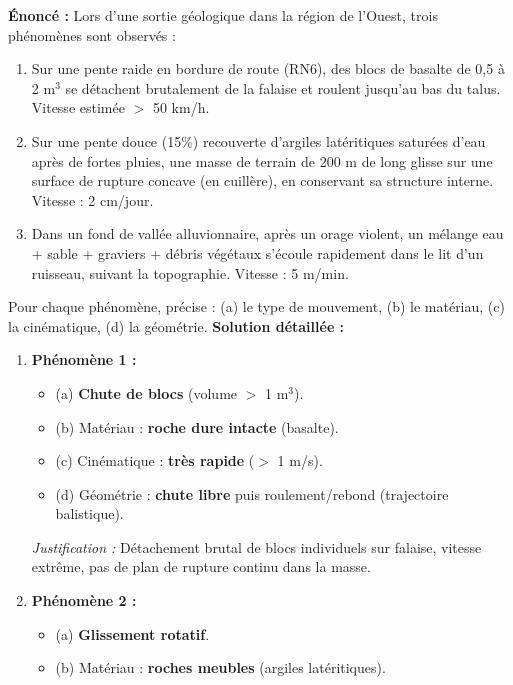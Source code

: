 \documentclass[11pt]{article}
\begin{document}
\begin{exoresolu}
    \textbf{Énoncé :} Lors d'une sortie géologique dans la région de l'Ouest, trois phénomènes sont observés :
    \begin{enumerate}
        \item Sur une pente raide en bordure de route (RN6), des blocs de basalte de 0,5 à 2 m$^3$ se détachent brutalement de la falaise et roulent jusqu'au bas du talus. Vitesse estimée $>$ 50 km/h.
        \item Sur une pente douce (15\%) recouverte d'argiles latéritiques saturées d'eau après de fortes pluies, une masse de terrain de 200 m de long glisse sur une surface de rupture concave (en cuillère), en conservant sa structure interne. Vitesse : 2 cm/jour.
        \item Dans un fond de vallée alluvionnaire, après un orage violent, un mélange eau + sable + graviers + débris végétaux s'écoule rapidement dans le lit d'un ruisseau, suivant la topographie. Vitesse : 5 m/min.
    \end{enumerate}
    Pour chaque phénomène, précise : (a) le type de mouvement, (b) le matériau, (c) la cinématique, (d) la géométrie.
    \tcblower
    \textbf{Solution détaillée :}
    \begin{enumerate}
        \item \textbf{Phénomène 1 :}
            \begin{itemize}
                \item (a) \textbf{Chute de blocs} (volume $>$ 1 m$^3$).
                \item (b) Matériau : \textbf{roche dure intacte} (basalte).
                \item (c) Cinématique : \textbf{très rapide} ($>$ 1 m/s).
                \item (d) Géométrie : \textbf{chute libre} puis roulement/rebond (trajectoire balistique).
            \end{itemize}
            \textit{Justification :} Détachement brutal de blocs individuels sur falaise, vitesse extrême, pas de plan de rupture continu dans la masse.
        \item \textbf{Phénomène 2 :}
            \begin{itemize}
                \item (a) \textbf{Glissement rotatif}.
                \item (b) Matériau : \textbf{roches meubles} (argiles latéritiques).

\end{itemize}
\end{enumerate}
\end{exoresolu}
\end{document}
